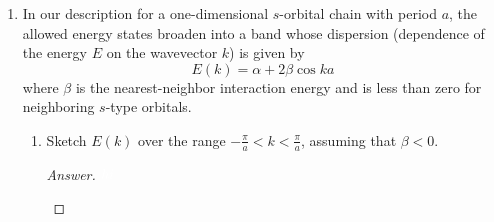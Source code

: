 \documentclass[../psets.tex]{subfiles}
\begin{document}
\begin{enumerate}[label={\Roman*)}]
    \item {}In our description for a one-dimensional $s$-orbital chain with period $a$, the allowed energy states broaden into a band whose dispersion (dependence of the energy $E$ on the wavevector $k$) is given by
    \begin{equation*}
        E(k) = \alpha+2\beta\cos ka
    \end{equation*}
    where $\beta$ is the nearest-neighbor interaction energy and is less than zero for neighboring $s$-type orbitals.
    \begin{enumerate}[label={\alph*.}]
        \item Sketch $E(k)$ over the range $-\frac{\pi}{a}<k<\frac{\pi}{a}$, assuming that $\beta<0$.
        \begin{proof}[Answer]
            ${\color{white}hi}$
            \begin{center}
\end{center}
\end{proof}
\end{enumerate}
\end{enumerate}
\end{document}

